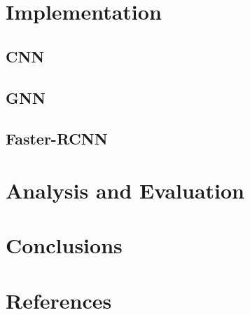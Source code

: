 \documentclass[12pt]{article}
\begin{document}
\section{Implementation}
\subsection{CNN}
\subsection{GNN}
\subsection{Faster-RCNN}

\section{Analysis and Evaluation}

\section{Conclusions}

\section{References}
\end{document}
